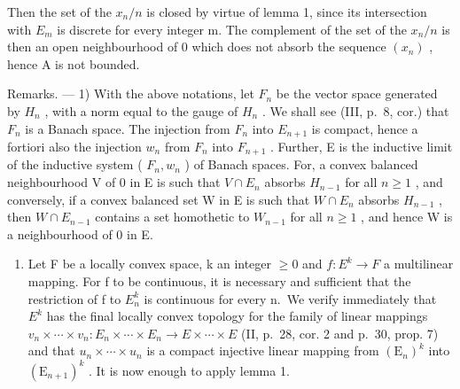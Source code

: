 Then the set of the \(x_{n}/n\) is closed by virtue of lemma 1, since its intersection with \(E_{m}\) is discrete for every integer m. The complement of the set of the \(x_{n}/n\) is then an open neighbourhood of 0 which does not absorb the sequence \((x_{n})\) , hence A is not bounded.

Remarks. --- 1) With the above notations, let \(F_{n}\) be the vector space generated by \(H_{n}\) , with a norm equal to the gauge of \(H_{n}\) . We shall see (III, p.~8, cor.) that \(F_{n}\) is a Banach space. The injection from \(F_{n}\) into \(E_{n+1}\) is compact, hence a fortiori also the injection \(w_{n}\) from \(F_{n}\) into \(F_{n+1}\) . Further, E is the inductive limit of the inductive system ( \(F_{n}, w_{n}\) ) of Banach spaces. For, a convex balanced neighbourhood V of 0 in E is such that \(V \cap E_{n}\) absorbs \(H_{n-1}\) for all \(n \geqslant 1\) , and conversely, if a convex balanced set W in E is such that \(W \cap E_{n}\) absorbs \(H_{n-1}\) , then \(W \cap E_{n-1}\) contains a set homothetic to \(W_{n-1}\) for all \(n \geqslant 1\) , and hence W is a neighbourhood of 0 in E.

\begin{enumerate}
\def\labelenumi{\arabic{enumi})}
\setcounter{enumi}{1}
\tightlist
\item
  Let F be a locally convex space, k an integer \(\geqslant0\) and \(f:E^{k}\rightarrow F\) a multilinear mapping. For f to be continuous, it is necessary and sufficient that the restriction of f to \(E_{n}^{k}\) is continuous for every n.~We verify immediately that \(E^{k}\) has the final locally convex topology for the family of linear mappings \(v_{n}\times\cdots\times v_{n}:E_{n}\times\cdots\times E_{n}\to E\times\cdots\times E\) (II, p.~28, cor. 2 and p.~30, prop. 7) and that \(u_{n}\times\cdots\times u_{n}\) is a compact injective linear mapping from \((\mathrm{E}_{n})^{k}\) into \((\mathrm{E}_{n+1})^{k}\) . It is now enough to apply lemma 1.
\end{enumerate}
